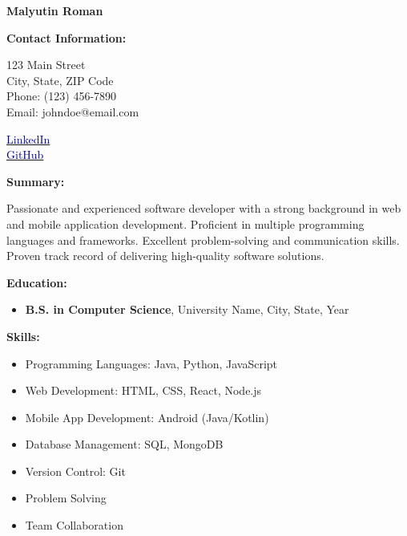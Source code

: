\documentclass[a4paper,10pt]{article}
\begin{document}
\begin{center}
    \textbf{\LARGE Malyutin Roman}
\end{center}

\begin{flushleft}
    \textbf{Contact Information:}
\end{flushleft}

\begin{minipage}{.5\textwidth}
    123 Main Street \\
    City, State, ZIP Code \\
    Phone: (123) 456-7890 \\
    Email: johndoe@email.com
\end{minipage}

\begin{minipage}{.5\textwidth}
    \begin{flushright}
        \href{https://www.linkedin.com/in/johndoe}{\textcolor{darkblue}{LinkedIn}} \\
        \href{https://github.com/johndoe}{\textcolor{darkblue}{GitHub}}
    \end{flushright}
\end{minipage}

\begin{flushleft}
    \textbf{Summary:}
\end{flushleft}

Passionate and experienced software developer with a strong background in web and mobile application development. Proficient in multiple programming languages and frameworks. Excellent problem-solving and communication skills. Proven track record of delivering high-quality software solutions.

\begin{flushleft}
    \textbf{Education:}
\end{flushleft}

\begin{itemize}[label=--,left=0pt]
    \item \textbf{B.S. in Computer Science}, University Name, City, State, Year
\end{itemize}

\begin{flushleft}
    \textbf{Skills:}
\end{flushleft}

\begin{itemize}[label=--,left=0pt]
    \item Programming Languages: Java, Python, JavaScript
    \item Web Development: HTML, CSS, React, Node.js
    \item Mobile App Development: Android (Java/Kotlin)
    \item Database Management: SQL, MongoDB
    \item Version Control: Git
    \item Problem Solving
    \item Team Collaboration
\end{itemize}
\end{document}
